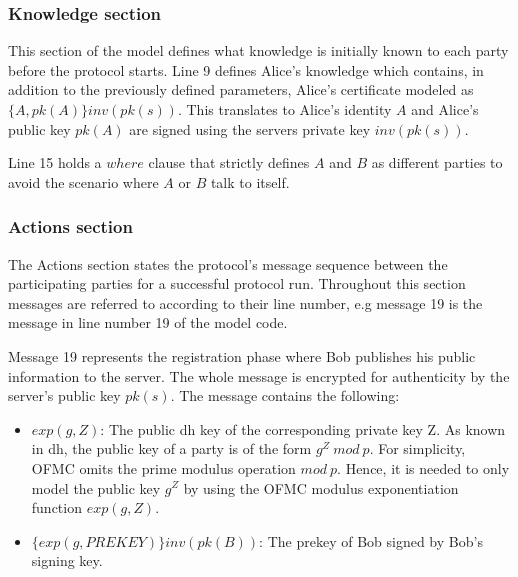 \subsubsection{Knowledge section}
This section of the model defines what knowledge is initially known to each party before the protocol starts. Line 9 defines Alice's knowledge which contains, in addition to the previously defined parameters, Alice's certificate modeled as $\{A, pk(A)\}inv(pk(s))$. This translates to Alice's identity $A$ and Alice's public key $pk(A)$ are signed using the servers private key $inv(pk(s))$. 

Line 15 holds a $where$ clause that strictly defines $A$ and $B$ as different parties to avoid the scenario where $A$ or $B$ talk to itself.
\subsubsection{Actions section}
The Actions section states the protocol's message sequence between the participating parties for a successful protocol run. Throughout this section messages are referred to according to their line number, e.g message 19 is the message in line number 19 of the model code.
\par
Message 19 represents the registration phase where Bob publishes his public information to the server. The whole message is encrypted for authenticity by the server's public key $pk(s)$. The message contains the following:
\begin{itemize}
	\item $exp(g,Z)$: The public \gls{dh} key of the corresponding private key Z. As known in \gls{dh}, the public key of a party is of the form $g^{Z}\ mod\ p$. For simplicity, OFMC omits the prime modulus operation $mod\ p$. Hence, it is needed to only model the public key $g^{Z}$ by using the OFMC modulus exponentiation function $exp(g,Z)$.
	\item $\{exp(g,PREKEY)\}inv(pk(B))$: The prekey of Bob signed by Bob's signing key.
\end{itemize}

